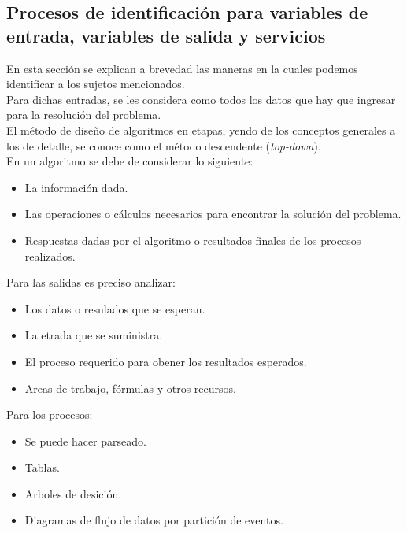 \documentclass[letterpaper, 12pt]{article}
\begin{document}
\begin{justify}
        \section*{Procesos de identificación para variables de entrada, variables de salida y servicios}
        \justify
        En esta sección se explican a brevedad las maneras en la cuales podemos identificar a los sujetos mencionados.
        \\\newline
        Para dichas entradas, se les considera como todos los datos que hay que ingresar para la resolución del problema. 
        \\\newline
        El método de diseño de algoritmos en etapas, yendo de los conceptos
        generales a los de detalle, se conoce como el método descendente (\emph{top-down}).
        \\\newline
        En un algoritmo se debe de considerar lo siguiente:
        \begin{itemize}
            \item La información dada.
            \item Las operaciones o cálculos necesarios para encontrar la solución del problema.
            \item Respuestas dadas por el algoritmo o resultados finales de los procesos realizados.
        \end{itemize}
        Para las salidas es preciso analizar:
        \begin{itemize}
            \item Los datos o resulados que se esperan.
            \item La etrada que se suministra.
            \item El proceso requerido para obener los resultados esperados.
            \item Areas de trabajo, fórmulas y otros recursos. 
        \end{itemize}
        Para los procesos:
        \begin{itemize}
            \item Se puede hacer parseado.
            \item Tablas.
            \item Arboles de desición.
            \item Diagramas de flujo de datos por partición de eventos.
        \end{itemize}
    \end{justify}

        \thispagestyle{empty}
        \printbibliography
\end{document}
